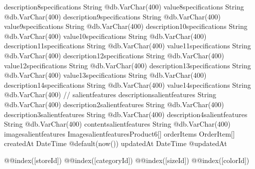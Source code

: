 {  description8specifications   String                         @db.VarChar(400)
  value8specifications         String                         @db.VarChar(400)
  description9specifications   String                         @db.VarChar(400)
  value9specifications         String                         @db.VarChar(400)
  description10specifications  String                         @db.VarChar(400)
  value10specifications        String                         @db.VarChar(400)
  description11specifications  String                         @db.VarChar(400)
  value11specifications        String                         @db.VarChar(400)
  description12specifications  String                         @db.VarChar(400)
  value12specifications        String                         @db.VarChar(400)
  description13specifications  String                         @db.VarChar(400)
  value13specifications        String                         @db.VarChar(400)
  description14specifications  String                         @db.VarChar(400)
  value14specifications        String                         @db.VarChar(400)
  // salientfeatures
  descriptionsalientfeatures   String                         @db.VarChar(400)
  description2salientfeatures  String                         @db.VarChar(400)
  description3salientfeatures  String                         @db.VarChar(400)
  description4salientfeatures  String                         @db.VarChar(400)
  contentsalientfeatures       String                         @db.VarChar(400)
  imagesalientfeatures ImagesalientfeaturesProduct6[]
  orderItems                   OrderItem[]
  createdAt                    DateTime                       @default(now())
  updatedAt                    DateTime                       @updatedAt

  @@index([storeId])
  @@index([categoryId])
  @@index([sizeId])
  @@index([colorId])
}

